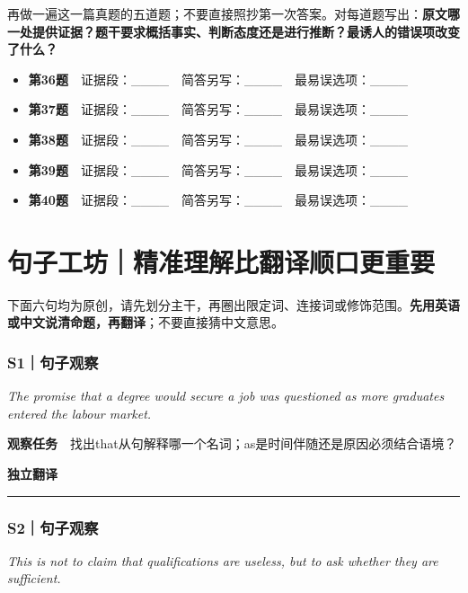 \documentclass[
  11pt,
]{ctexart}
\renewenvironment{quote}{\begin{tcolorbox}[enhanced,breakable,colback=sand,colframe=primary!22,boxrule=0.4pt,arc=2pt,left=2.6mm,right=2.6mm,top=1.6mm,bottom=1.6mm]\itshape}{\end{tcolorbox}}
\begin{document}
再做一遍这一篇真题的五道题；不要直接照抄第一次答案。对每道题写出：\textbf{原文哪一处提供证据？题干要求概括事实、判断态度还是进行推断？最诱人的错误项改变了什么？}

\begin{itemize}
\item
  \textbf{第36题}　证据段：\_\_\_\_　简答另写：\_\_\_\_　最易误选项：\_\_\_\_
\item
  \textbf{第37题}　证据段：\_\_\_\_　简答另写：\_\_\_\_　最易误选项：\_\_\_\_
\item
  \textbf{第38题}　证据段：\_\_\_\_　简答另写：\_\_\_\_　最易误选项：\_\_\_\_
\item
  \textbf{第39题}　证据段：\_\_\_\_　简答另写：\_\_\_\_　最易误选项：\_\_\_\_
\item
  \textbf{第40题}　证据段：\_\_\_\_　简答另写：\_\_\_\_　最易误选项：\_\_\_\_
\end{itemize}

\section{句子工坊｜精准理解比翻译顺口更重要}\label{ux53e5ux5b50ux5de5ux574aux7cbeux51c6ux7406ux89e3ux6bd4ux7ffbux8bd1ux987aux53e3ux66f4ux91cdux8981}

下面六句均为原创，请先划分主干，再圈出限定词、连接词或修饰范围。\textbf{先用英语或中文说清命题，再翻译}；不要直接猜中文意思。

\subsubsection{S1｜句子观察}\label{s1ux53e5ux5b50ux89c2ux5bdf}

\begin{quote}
The promise that a degree would secure a job was questioned as more
graduates entered the labour market.
\end{quote}

\textbf{观察任务}　找出that从句解释哪一个名词；as是时间伴随还是原因必须结合语境？

\textbf{独立翻译}　

\rule{0.8\linewidth}{0.35pt}

\subsubsection{S2｜句子观察}\label{s2ux53e5ux5b50ux89c2ux5bdf}

\begin{quote}
This is not to claim that qualifications are useless, but to ask whether
they are sufficient.
\end{quote}
\end{document}
